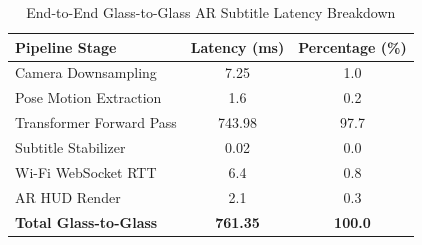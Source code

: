 \begin{table}[h]
\centering
\caption{End-to-End Glass-to-Glass AR Subtitle Latency Breakdown}
\label{tab:latency_breakdown}
\begin{tabular}{lcc}
\hline
\textbf{Pipeline Stage} & \textbf{Latency (ms)} & \textbf{Percentage (\%)} \\
\hline
Camera Downsampling & 7.25 & 1.0 \\
Pose Motion Extraction & 1.6 & 0.2 \\
Transformer Forward Pass & 743.98 & 97.7 \\
Subtitle Stabilizer & 0.02 & 0.0 \\
Wi-Fi WebSocket RTT & 6.4 & 0.8 \\
AR HUD Render & 2.1 & 0.3 \\
\hline
\textbf{Total Glass-to-Glass} & \textbf{761.35} & \textbf{100.0} \\
\hline
\end{tabular}
\end{table}
